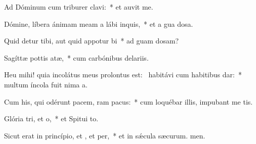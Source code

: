 \item Ad Dóminum cum triburer clavi:~* et auvit me.
\item Dómine, líbera ánimam meam a lábi inquis,~* et a gua dosa.
\item Quid detur tibi, aut quid appotur bi~* ad guam dosam?
\item Sagíttæ pottis atæ,~* cum carbónibus delariis.
\item Heu mihi! quia incolátus meus prolontus est:~\pscross{} habitávi cum habitibus dar:~* multum íncola fuit nima a.
\item Cum his, qui odérunt pacem, ram pacus:~* cum loquébar illis, impubant me tis.
\item Glória tri, et o,~* et Spitui to.
\item Sicut erat in princípio, et , et per,~* et in sǽcula sæcurum. men.
